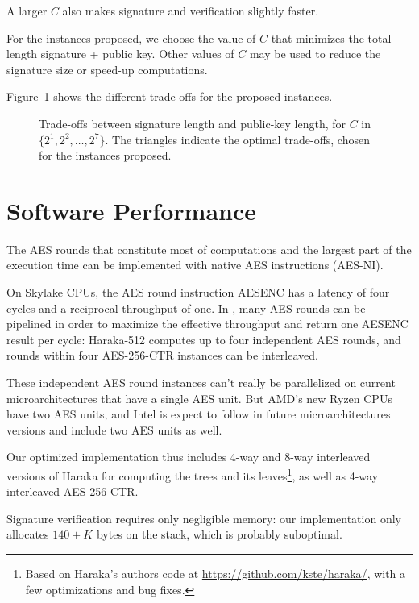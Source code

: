 A larger $C$ also makes signature and verification slightly faster.

For the \gravity instances proposed, we choose the value of $C$ that minimizes the total length signature + public key. 
Other values of $C$ may be used to reduce the signature size or speed-up computations.

Figure~\ref{fig:subtrees} shows the different trade-offs for the proposed \gravity instances.

\begin{figure}
\centering
\caption{Trade-offs between signature length and public-key length, for $C$ in $\{2^1, 2^2, \dots, 2^7\}$. The triangles indicate the optimal trade-offs, chosen for the instances proposed.}
\label{fig:subtrees}
\end{figure}


\section{Software Performance}

The AES rounds that constitute most of \gravity computations and the largest part of the execution time can be implemented with native AES instructions (AES-NI).

On Skylake CPUs, the AES round instruction AESENC has a latency of four cycles and a reciprocal throughput of one.
In \gravity, many AES rounds can be pipelined in order to maximize the effective throughput and return one AESENC result per cycle: Haraka-512 computes up to four independent AES rounds, and rounds within four AES-256-CTR instances can be interleaved.

These independent AES round instances can't really be parallelized on current microarchitectures that have a single AES unit. 
But AMD's new Ryzen CPUs have two AES units, and Intel is expect to follow in future microarchitectures versions and include two AES units as well.

Our optimized implementation thus includes 4-way and 8-way interleaved versions of Haraka for computing the trees and its leaves\footnote{Based on Haraka's authors code at \url{https://github.com/kste/haraka/}, with a few optimizations and bug fixes.}, as well as 4-way interleaved AES-256-CTR.

Signature verification requires only negligible memory: our implementation only allocates $140+K$ bytes on the stack, which is probably suboptimal. 

